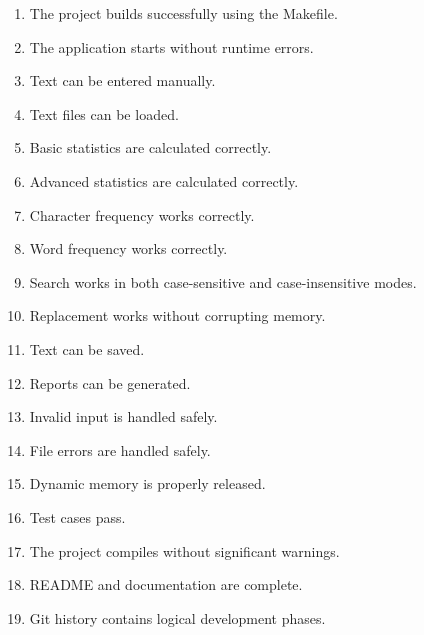 \documentclass[12pt,a4paper]{article}
\begin{document}
\begin{enumerate}

    \item The project builds successfully using the Makefile.

    \item The application starts without runtime errors.

    \item Text can be entered manually.

    \item Text files can be loaded.

    \item Basic statistics are calculated correctly.

    \item Advanced statistics are calculated correctly.

    \item Character frequency works correctly.

    \item Word frequency works correctly.

    \item Search works in both case-sensitive and
    case-insensitive modes.

    \item Replacement works without corrupting memory.

    \item Text can be saved.

    \item Reports can be generated.

    \item Invalid input is handled safely.

    \item File errors are handled safely.

    \item Dynamic memory is properly released.

    \item Test cases pass.

    \item The project compiles without significant warnings.

    \item README and documentation are complete.

    \item Git history contains logical development phases.

\end{enumerate}
\end{document}

